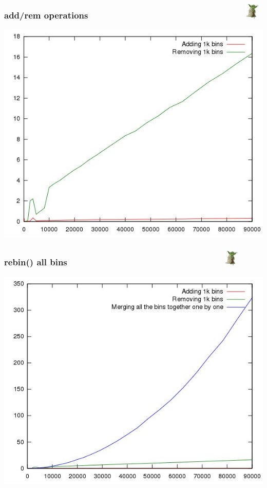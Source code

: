 \documentclass{beamer}
\begin{document}
  \begin{frame}
    \frametitle{add/rem operations \ \ \ \ \ \ \ \ \ \ \ \ \ \ \ \ \ \ \ \ \ \ \ \ \ \ \ \ \ \ \ \   \includegraphics[width=0.05\textwidth]{yoda-logo}}
    \includegraphics[height=0.89\textheight]{2.jpg}
  \end{frame}

  \begin{frame}
    \frametitle{rebin() all bins \ \ \ \ \ \ \ \ \ \ \ \ \ \ \ \ \ \ \ \ \ \ \ \ \ \ \ \ \ \ \ \   \includegraphics[width=0.05\textwidth]{yoda-logo}}
    \includegraphics[height=0.89\textheight]{2a.jpg}
  \end{frame}
\end{document}
